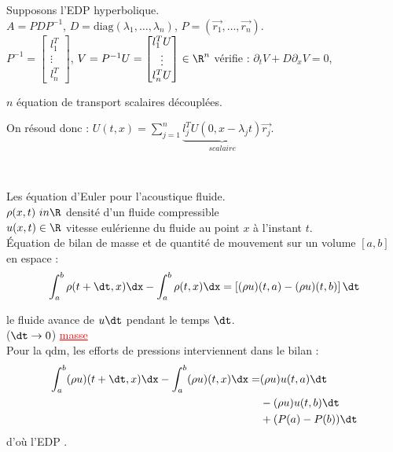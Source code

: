 \documentclass[12pt,a4paper]{article}
\begin{document}
	
	Supposons l'EDP hyperbolique.\\
	$A = PDP^{-1}$, $D = \mathrm{diag}(\lambda_1,\ldots,\lambda_n)$, $P = (\vec{r_1},\ldots,\vec{r_n})$.\\
	$P^{-1} = \begin{bmatrix}
		l_1^T\\
		\vdots\\
		l_n^T
	\end{bmatrix}$, $V=P^{-1}U = \begin{bmatrix}
		l_1^TU \\
		\vdots\\
		l_n^T U
	\end{bmatrix} \in \R^n$ vérifie : $\partial_t V+ D \partial_x V = 0$, \begin{minipage}[t]{6cm}
		$ n$ équation de transport scalaires découplées.
	\end{minipage}
	
	On résoud donc : $U(t,x) = \displaystyle \sum_{j=1}^n \underbrace{l_j^T U(0,x-\lambda_j t)}_{scalaire}\vec{r_j}$.
	
	\begin{ex}[physique]$ $\\
		\begin{minipage}[t]{17cm}
			Les équation d'Euler pour l'acoustique fluide.\\
			$\rho(x,t) \ in \R$ densité d'un fluide compressible\\
			$u(x,t) \in \R$ vitesse eulérienne du fluide au point $x$ à l'instant $t$.\\
			Équation de bilan de masse et de quantité de mouvement sur un volume $[a,b]$ en espace :
			\[
			\int_a^b \rho(t+\dt,x)\dx - \int_a^b \rho(t,x)\dx = \left[(\rho u)(t,a)-(\rho u)(t,b)\right]\dt
			\]
			
		\end{minipage}
		
		\begin{minipage}{17cm}
			le fluide avance de $u\dt$ pendant le temps $\dt$.\\
			($\dt \to 0$)  \textcolor{red}{\underline{masse}}\\
			Pour la qdm, les efforts de pressions interviennent dans le bilan :
			\[
			\begin{aligned}
				\int_a^b (\rho u)(t+\dt,x) \dx - \int_a^b (\rho u)(t,x)\dx =& (\rho u)u(t,a)\dt\\
				&-(\rho u)u(t,b)\dt\\
				&+(P(a)-P(b))\dt
			\end{aligned}
			\]
			d'où l'EDP .
		\end{minipage}
	\end{ex}
	
\end{document}
